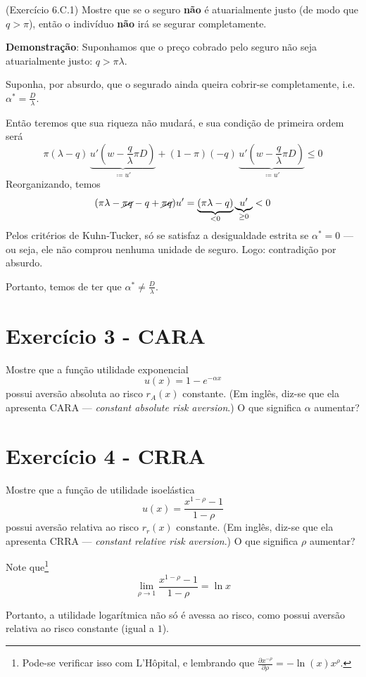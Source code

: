 \documentclass[12pt]{article}
\numberwithin{equation}{section}
\theoremstyle{plain}
\theoremstyle{definition}
\theoremstyle{remark}
\begin{document}
(Exercício 6.C.1) Mostre que se o seguro \textbf{não} é atuarialmente justo (de modo que \(q>\pi\)), então o indivíduo \textbf{não} irá se segurar completamente.

\textbf{Demonstração}: Suponhamos que o preço cobrado pelo seguro não seja atuarialmente justo: \(q > \pi\lambda\).

Suponha, por absurdo, que o segurado ainda queira cobrir-se completamente, i.e.~\(\alpha^{*} = \frac{D}{\lambda}\).

Então teremos que sua riqueza não mudará, e sua condição de primeira ordem será
\[
\pi (\lambda - q)\, \underbrace{ u'\left( w - \frac{q}{\lambda} \pi D  \right) }_{ \coloneqq u' } + (1-\pi) (-q) \, \underbrace{ u'\left( w - \frac{q}{\lambda} \pi D \right) }_{ \coloneqq u' } \leq 0
\]
Reorganizando, temos
\[
(\pi \lambda - \cancel{ \pi q } - q + \cancel{ \pi q }) u' = \underbrace{ (\pi\lambda - q) }_{ < 0 } \underbrace{ u' }_{ \geq 0 } < 0
\]
Pelos critérios de Kuhn-Tucker, só se satisfaz a desigualdade estrita se \(\alpha^{*} = 0\) --- ou seja, ele não comprou nenhuma unidade de seguro. Logo: contradição por absurdo.

Portanto, temos de ter que \(\alpha^{*} \neq \frac{D}{\lambda}\).

\hypertarget{exercuxedcio-3---cara}{%
\section{Exercício 3 - CARA}\label{exercuxedcio-3---cara}}

Mostre que a função utilidade exponencial
\[
u(x) = 1 - e^{-\alpha x}
\]
possui aversão absoluta ao risco \(r_{A}(x)\) constante. (Em inglês, diz-se que ela apresenta CARA --- \textit{constant absolute risk aversion}.) O que significa \(\alpha\) aumentar?

\hypertarget{exercuxedcio-4---crra}{%
\section{Exercício 4 - CRRA}\label{exercuxedcio-4---crra}}

Mostre que a função de utilidade isoelástica
\[
u(x) = \frac{x^{1-\rho} -1}{1-\rho}
\]
possui aversão relativa ao risco \(r_{r}(x)\) constante. (Em inglês, diz-se que ela apresenta CRRA --- \textit{constant relative risk aversion}.) O que significa \(\rho\) aumentar?

Note que\footnote{Pode-se verificar isso com L'Hôpital, e lembrando que \(\frac{ \partial x^{-\rho}}{ \partial \rho } = -\ln(x) x^\rho\).}
\[
\lim\limits_{\rho \to 1} \frac{x^{1-\rho} - 1}{1-\rho} = \ln x
\]

Portanto, a utilidade logarítmica não só é avessa ao risco, como possui aversão relativa ao risco constante (igual a \(1\)).

\printbibliography
\end{document}
